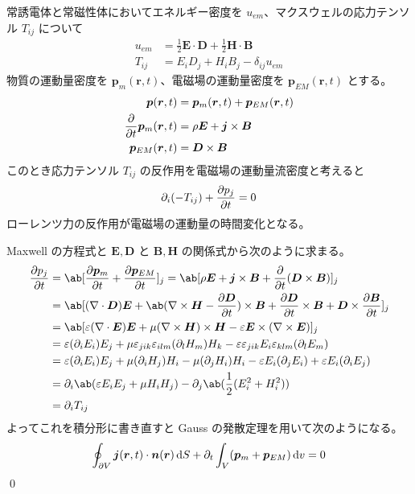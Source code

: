\documentclass[uplatex,dvipdfmx,a4paper,11pt]{jlreq}
\makeatletter
\newcommand{\EE}{\bm{E}}
\newcommand{\BB}{\bm{B}}
\newcommand{\DD}{\bm{D}}
\newcommand{\HH}{\bm{H}}
\newcommand{\rr}{\bm{r}}
\newcommand{\pp}{\bm{p}}
\newcommand{\vnabla}{\mathbf{\nabla}}
\numberwithin{equation}{section}
\theoremstyle{definition}
\renewenvironment{proof}[1][\proofname]{\par
  \normalfont
  \topsep6\p@\@plus6\p@ \trivlist
  \item[\hskip\labelsep{\bfseries #1}\@addpunct{\bfseries}]\ignorespaces\quad\par
}{%
  \qed\endtrivlist\@endpefalse
}
\renewcommand\proofname{証明}
\makeatother
\begin{document}
\begin{theorem}[運動量保存則]
  常誘電体と常磁性体においてエネルギー密度を $u_{em}$、マクスウェルの応力テンソル $T_{ij}$ について
  \begin{align}
    u_{em} & = \frac{1}{2}\EE\cdot\DD + \frac{1}{2}\HH\cdot\BB \\
    T_{ij} & = E_iD_j + H_iB_j - \delta_{ij}u_{em}
  \end{align}
  物質の運動量密度を $\pp_m(\rr, t)$、電磁場の運動量密度を $\pp_{EM}(\rr, t)$ とする。
  \begin{align}
    \pp(\rr, t)              & = \pp_m(\rr, t) + \pp_{EM}(\rr, t) \\
    \diffp{}{t}\pp_m(\rr, t) & = \rho\EE + \bm{j}\times\BB        \\
    \pp_{EM}(\rr, t)         & = \DD\times\BB
  \end{align}
  このとき応力テンソル $T_{ij}$ の反作用を電磁場の運動量流密度と考えると
  \begin{align}
    \partial_i(-T_{ij}) + \diffp{p_j}{t} = 0
  \end{align}
  ローレンツ力の反作用が電磁場の運動量の時間変化となる。
\end{theorem}
\begin{proof}
  Maxwell の方程式と $\EE, \DD$ と $\BB, \HH$ の関係式から次のように求まる。
  \begin{align}
    \diffp{p_j}{t} & = \ab[\diffp{\pp_m}{t} + \diffp{\pp_{EM}}{t}]_j = \ab[\rho\EE + \bm{j}\times\BB + \diffp{}{t}(\DD\times\BB)]_j                                              \\
                   & = \ab[(\vnabla\cdot\DD)\EE + \ab(\vnabla\times\HH - \diffp{\DD}{t})\times\BB + \diffp{\DD}{t}\times\BB + \DD\times\diffp{\BB}{t}]_j                         \\
                   & = \ab[\varepsilon(\vnabla\cdot\EE)\EE + \mu(\vnabla\times\HH)\times\HH - \varepsilon\EE\times(\vnabla\times\EE)]_j                                          \\
                   & = \varepsilon(\partial_iE_i)E_j + \mu\varepsilon_{jik}\varepsilon_{ilm}(\partial_lH_m)H_k - \varepsilon\varepsilon_{jik}E_i\varepsilon_{klm}(\partial_lE_m) \\
                   & = \varepsilon(\partial_iE_i)E_j + \mu(\partial_iH_j)H_i - \mu(\partial_jH_i)H_i - \varepsilon E_i(\partial_jE_i) + \varepsilon E_i(\partial_iE_j)           \\
                   & = \partial_i\ab(\varepsilon E_iE_j + \mu H_iH_j) - \partial_j\ab(\frac{1}{2}(E_i^2 + H_i^2))                                                                \\
                   & = \partial_iT_{ij}
  \end{align}
  よってこれを積分形に書き直すと Gauss の発散定理を用いて次のようになる。
  \begin{align}
    \oint_{\partial V}\bm{j}(\rr, t)\cdot\bm{n}(\rr)\dl{S} + \partial_t\int_V(\pp_m + \pp_{EM})\dl{v} = 0
  \end{align}
\end{proof}
\end{document}
